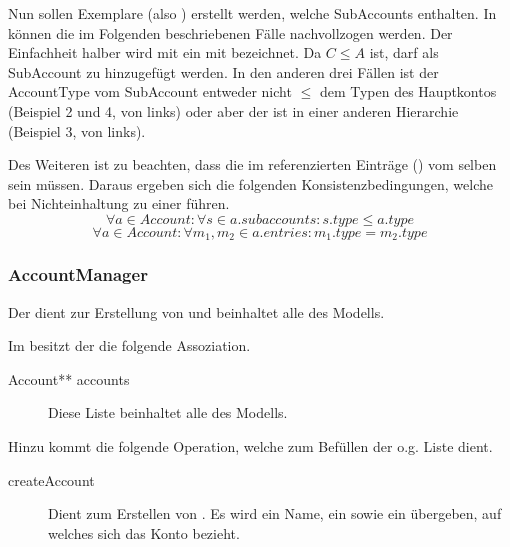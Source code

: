 
Nun sollen Exemplare (also ) erstellt werden, welche SubAccounts enthalten. In  können die im Folgenden beschriebenen Fälle nachvollzogen werden.
Der Einfachheit halber wird mit  ein   mit   bezeichnet. Da $C \leq A$ ist, darf  als SubAccount zu  hinzugefügt werden.
In den anderen drei Fällen ist der AccountType vom SubAccount entweder nicht $\leq$ dem Typen des Hauptkontos (Beispiel 2 und 4, von links) oder aber der  ist in einer anderen Hierarchie (Beispiel 3, von links).


Des Weiteren ist zu beachten, dass die im  referenzierten Einträge () vom selben 
 sein müssen. Daraus ergeben sich die folgenden Konsistenzbedingungen, 
welche bei Nichteinhaltung zu einer  führen.
\begin{equation}
	\forall a \in Account: \forall s \in a.subaccounts: s.type \leq a.type
\end{equation}
\begin{equation}
	\forall a \in Account: \forall m_1, m_2 \in a.entries: m_1.type = m_2.type
\end{equation}


\subsubsection{AccountManager}
Der  dient zur Erstellung von  und beinhaltet alle  des Modells.

Im \MM besitzt der  die folgende Assoziation.
\begin{description}
	\item[Account** accounts] Diese Liste beinhaltet alle  des Modells.
\end{description}

Hinzu kommt die folgende Operation, welche zum Befüllen der o.g. Liste dient.
\begin{description}
	\item[createAccount] Dient zum Erstellen von . Es wird ein Name, ein  sowie ein  übergeben, auf welches sich das Konto bezieht.
\end{description}

